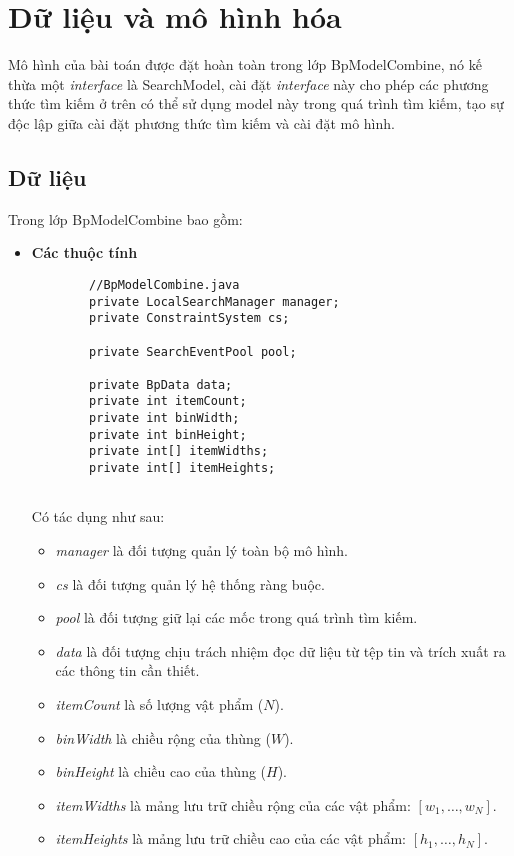 \section{Dữ liệu và mô hình hóa}
Mô hình của bài toán được đặt hoàn toàn trong lớp \textsf{BpModelCombine}, nó kế thừa một \textit{interface} là \textsf{SearchModel}, cài đặt \textit{interface} này cho phép các phương thức tìm kiếm ở trên có thể sử dụng model này trong quá trình tìm kiếm, tạo sự độc lập giữa cài đặt phương thức tìm kiếm và cài đặt mô hình.

\subsection{Dữ liệu}
Trong lớp \textsf{BpModelCombine} bao gồm:
\begin{itemize}
	\item \textbf{Các thuộc tính}
	\begin{lstlisting}
		//BpModelCombine.java
		private LocalSearchManager manager;
		private ConstraintSystem cs;
	
		private SearchEventPool pool;
	
		private BpData data;
		private int itemCount;
		private int binWidth;
		private int binHeight;
		private int[] itemWidths;
		private int[] itemHeights;
	
	\end{lstlisting}

	Có tác dụng như sau:
	\begin{itemize}
		\item \textit{manager} là đối tượng quản lý toàn bộ mô hình.
		\item \textit{cs} là đối tượng quản lý hệ thống ràng buộc.
		\item \textit{pool} là đối tượng giữ lại các mốc trong quá trình tìm kiếm.
		\item \textit{data} là đối tượng chịu trách nhiệm đọc dữ liệu từ tệp tin và trích xuất ra các thông tin cần thiết.
		\item \textit{itemCount} là số lượng vật phẩm ($N$).
		\item \textit{binWidth} là chiều rộng của thùng ($W$).
		\item \textit{binHeight} là chiều cao của thùng ($H$).
		\item \textit{itemWidths} là mảng lưu trữ chiều rộng của các vật phẩm: $[w_1,\dotsc,w_N]$.
		\item \textit{itemHeights} là mảng lưu trữ chiều cao của các vật phẩm: $[h_1,\dotsc,h_N]$.
	\end{itemize}


\end{itemize}
